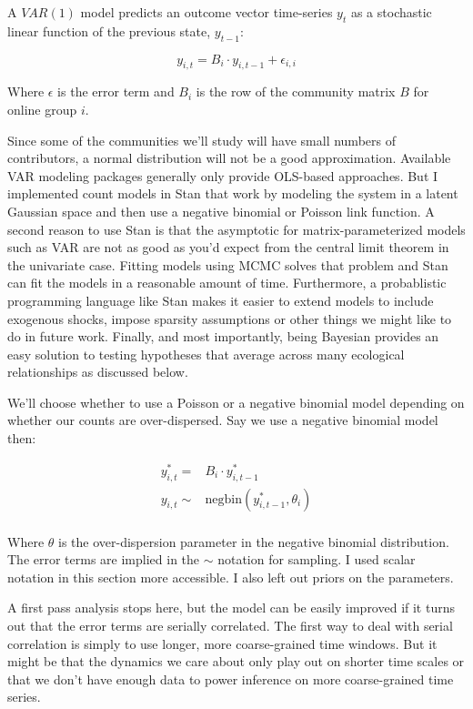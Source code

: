 \documentclass[12pt]{memoir}
\begin{document}
A $VAR(1)$ model predicts an outcome vector time-series $y_t$ as a stochastic linear function of the previous state, $y_{t-1}$:

$$ y_{i,t} = B_i \cdot y_{i,t-1} + \epsilon_{i,i} $$

Where $\epsilon$ is the error term and $B_i$ is the row of the community matrix $B$ for online group $i$.

Since some of the communities we'll study will have small numbers of contributors, a normal distribution will not be a good approximation.  Available VAR modeling packages generally only provide OLS-based approaches. But I implemented count models in Stan that work by modeling the system in a latent Gaussian space and then use a negative binomial or Poisson link function. A second reason to use Stan is that the asymptotic for matrix-parameterized models such as VAR are not as good as you'd expect from the central limit theorem in the univariate case.  Fitting models using MCMC solves that problem and Stan can fit the models in a reasonable amount of time.  Furthermore, a probablistic programming language like Stan makes it easier to extend models to include exogenous shocks, impose sparsity assumptions or other things we might like to do in future work. Finally, and most importantly, being Bayesian provides an easy solution to testing hypotheses that average across many ecological relationships as discussed below.

We'll choose whether to use a Poisson or a negative binomial model depending on whether our counts are over-dispersed.  Say we use a negative binomial model then:

\begin{align*}
  y^*_{i,t} = & B_i \cdot y^*_{i,t-1} \\
  y_{i,t} \sim & \mathrm{negbin}(y^*_{i,t-1}, \theta_{i}) \\
\end{align*}

Where $\theta$ is the over-dispersion parameter in the negative binomial distribution.  The error terms are implied in the $\sim$ notation for sampling. I used scalar notation in this section more accessible.  I also left out priors on the parameters.

A first pass analysis stops here, but the model can be easily improved if it turns out that the error terms are serially correlated.  The first way to deal with serial correlation is simply to use longer, more coarse-grained time windows. But it might be that the dynamics we care about only play out on shorter time scales or that we don't have enough data to power inference on more coarse-grained time series.
\end{document}
